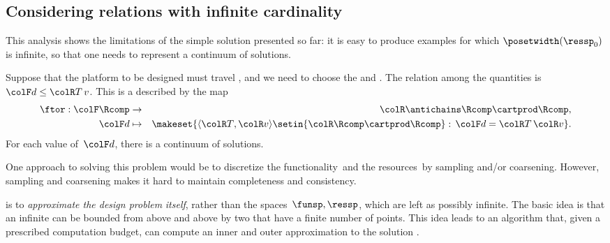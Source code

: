 \subsection{Considering relations with infinite cardinality}

This analysis shows the limitations of the simple solution presented so far: it is easy to produce examples for which $\posetwidth(\ressp_{0})$ is infinite, so that one needs to represent a continuum of solutions.

\begin{example}
    Suppose that the platform to be designed must travel , and we need to choose the  and .
    The relation among the quantities is~${\colF d}\leq{\colR T\,v}$.
    This is a  described by the map
    \begin{eqnarray*}
        \ftor:{\colF\Rcomp} & \to & {\colR\antichains\Rcomp\cartprod\Rcomp,}\\
        {\colF d} & \mapsto & \makeset{\langle{\colR T},{\colR v}\rangle\setin{\colR\Rcomp\cartprod\Rcomp}:\,{\colF d}={\colR T}\,{\colR v}}.
    \end{eqnarray*}
    For each value of~${\colF d}$, there is a continuum of solutions.
\end{example}
One approach to solving this problem would be to discretize the functionality~\funsp and the resources~\ressp by sampling and/or coarsening.
However, sampling and coarsening makes it hard to maintain completeness and consistency.

is to \emph{approximate the design problem} \emph{itself}, rather than the spaces~$\funsp,\ressp$, which are left as possibly infinite.
The basic idea is that an infinite  can be bounded from above and above by two  that have a finite number of points.
This idea leads to an algorithm that, given a prescribed computation budget, can compute an inner and outer approximation to the solution .
